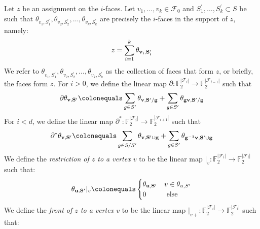 \begin{definition}
  Let $z$ be an assignment on the $i$-faces. Let $v_{1}, \ldots, v_{k} \in \mathcal{F}_{0}$ and $S^{\prime}_{1}, \ldots, S^{\prime}_{k} \subset S$ be such that $\theta_{v_{1},S^{\prime}_{1}}, \theta_{v_{2},S^{\prime}_{2}}, \ldots, \theta_{v_{k},S^{\prime}_{k}}$ are precisely the $i$-faces in the support of $z$, namely:
  \begin{equation*}
    \begin{split}
    z = \sum_{i=1}^{k}\mathbf{\theta_{v_{i} ,S^{\prime}_{i}} }
    \end{split}
  \end{equation*} 
  We refer to $\theta_{v_{1},S^{\prime}_{1}}, \theta_{v_{2},S^{\prime}_{2}}, \ldots, \theta_{v_{k},S^{\prime}_{k}}$ as the collection of faces that form $z$, or briefly, the faces form $z$.
  For $i > 0$, we define the linear map $\partial: \mathbb{F}_{2}^{|\mathcal{F}_{i}|} \rightarrow \mathbb{F}_{2}^{|\mathcal{F}_{i-1}|}$ such that
  \begin{equation*}
    \begin{split}
    \partial \rotfvs{} \colonequals \sum_{g \in S^{\prime}} \rotfv{v}{S^{\prime}/g} + \sum_{g \in S^{\prime}} \rotfv{gv}{S^{\prime}/g} 
    \end{split}
  \end{equation*}
  For $i < d$, we define the linear map $\partial^{*}: \mathbb{F}_{2}^{|\mathcal{F}_{i}|} \rightarrow \mathbb{F}_{2}^{|\mathcal{F}_{i+1}|}$ such that
  \begin{equation*}
    \begin{split}
      \partial^{*} \rotfvs{} \colonequals \sum_{g \in S/S^{\prime}} \rotfv{v}{S^{\prime} \cup g} + \sum_{g \in S^{\prime}} \rotfv{g^{-1}v}{S^{\prime}\cup g} 
    \end{split}
  \end{equation*}
  We define the \textit{restriction of $z$ to a vertex $v$} to be the linear map $|_{v} \colon \mathbb{F}_{2}^{|\mathcal{F}_{i}|} \rightarrow \mathbb{F}_{2}^{|\mathcal{F}_{i}|}$ such that: 
  \begin{equation*}
    \begin{split}
      \rotfv{u}{S^{\prime}} |_{v} \colonequals    
      \begin{cases}
      \rotfv{u}{S^{\prime}}  & v \in \theta_{u,S^{\prime}}  \\ 
        0 & \text{ else }
      \end{cases}
    \end{split}
  \end{equation*}
  We define the \textit{front of $z$ to a vertex $v$} to be the linear map $|_{v+} \colon \mathbb{F}_{2}^{|\mathcal{F}_{i}|} \rightarrow \mathbb{F}_{2}^{|\mathcal{F}_{i}|}$ such that: 

\end{definition}
